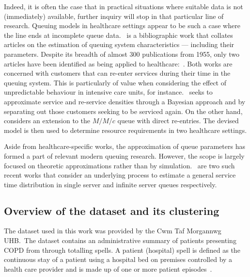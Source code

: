 Indeed, it is often the case that in practical situations where suitable data is
not (immediately) available, further inquiry will stop in that particular line
of research. Queuing models in healthcare settings appear to be such a case
where the line ends at incomplete queue data.~\cite{Asanjarani2017} is a
bibliographic work that collates articles on the estimation of queuing system
characteristics --- including their parameters.  Despite its breadth of almost
300 publications from 1955, only two articles have been identified as being
applied to healthcare:~\cite{Mohammadi2012,Yom2014}.  Both works are concerned
with customers that can re-enter services during their time in the queuing
system. This is particularly of value when considering the effect of
unpredictable behaviour in intensive care units, for
instance.~\cite{Mohammadi2012} seeks to approximate service and re-service
densities through a Bayesian approach and by separating out those customers
seeking to be serviced again. On the other hand,~\cite{Yom2014} considers an
extension to the \(M/M/c\) queue with direct re-entries. The devised model is
then used to determine resource requirements in two healthcare settings.

Aside from healthcare-specific works, the approximation of
queue parameters has formed a part of relevant modern queuing research. However,
the scope is largely focused on theoretic approximations rather than by
simulation.~\cite{Djabali2018,Goldenshluger2016} are two such recent
works that consider an underlying process to estimate a general service time
distribution in single server and infinite server queues respectively.

\subsection{Overview of the dataset and its clustering}\label{subsec:overview}

The dataset used in this work was provided by the Cwm Taf Morgannwg UHB.\ The
dataset contains an administrative summary of patients
presenting COPD from through totalling
spells. A patient (hospital) spell is defined as the
continuous stay of a patient using a hospital bed on premises controlled by a
health care provider and is made up of one or more patient
episodes~\cite{NHS2020}.

